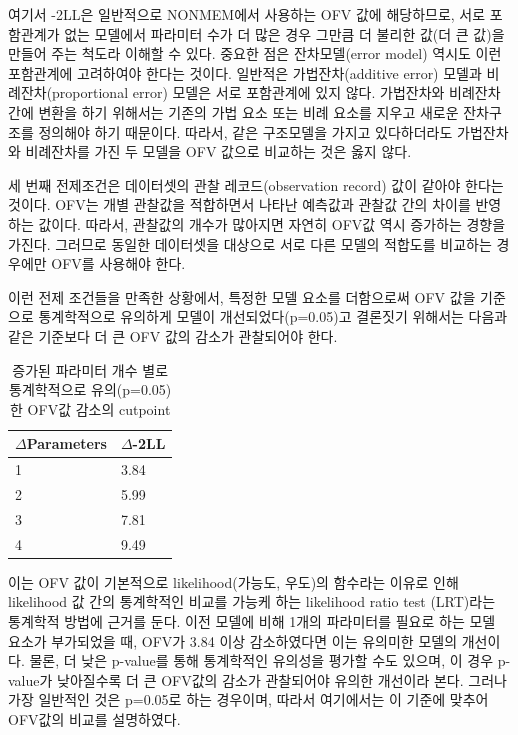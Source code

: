 \documentclass[
  10pt,
  krantz2,
  a4paper]{krantz}
\theoremstyle{definition}
\theoremstyle{definition}
\theoremstyle{definition}
\theoremstyle{remark}
\begin{document}
여기서 -2LL은 일반적으로 NONMEM에서 사용하는 OFV 값에 해당하므로, 서로 포함관계가 없는 모델에서 파라미터 수가 더 많은 경우 그만큼 더 불리한 값(더 큰 값)을 만들어 주는 척도라 이해할 수 있다. 중요한 점은 잔차모델(error model) 역시도 이런 포함관계에 고려하여야 한다는 것이다. 일반적은 가법잔차(additive error) 모델과 비례잔차(proportional error) 모델은 서로 포함관계에 있지 않다. 가법잔차와 비례잔차 간에 변환을 하기 위해서는 기존의 가법 요소 또는 비례 요소를 지우고 새로운 잔차구조를 정의해야 하기 때문이다. 따라서, 같은 구조모델을 가지고 있다하더라도 가법잔차와 비례잔차를 가진 두 모델을 OFV 값으로 비교하는 것은 옳지 않다.

세 번째 전제조건은 데이터셋의 관찰 레코드(observation record) 값이 같아야 한다는 것이다. OFV는 개별 관찰값을 적합하면서 나타난 예측값과 관찰값 간의 차이를 반영하는 값이다. 따라서, 관찰값의 개수가 많아지면 자연히 OFV값 역시 증가하는 경향을 가진다. 그러므로 동일한 데이터셋을 대상으로 서로 다른 모델의 적합도를 비교하는 경우에만 OFV를 사용해야 한다.

이런 전제 조건들을 만족한 상황에서, 특정한 모델 요소를 더함으로써 OFV 값을 기준으로 통계학적으로 유의하게 모델이 개선되었다(p=0.05)고 결론짓기 위해서는 다음과 같은 기준보다 더 큰 OFV 값의 감소가 관찰되어야 한다.

\begin{table}

\caption{\label{tab:unnamed-chunk-15}증가된 파라미터 개수 별로 통계학적으로 유의(p=0.05)한 OFV값 감소의 cutpoint}
\centering
\begin{tabular}[t]{ll}
\toprule
$\Delta$Parameters & $\Delta$-2LL\\
\midrule
1 & 3.84\\
2 & 5.99\\
3 & 7.81\\
4 & 9.49\\
\bottomrule
\end{tabular}
\end{table}

이는 OFV 값이 기본적으로 likelihood(가능도, 우도)의 함수라는 이유로 인해 likelihood 값 간의 통계학적인 비교를 가능케 하는 likelihood ratio test (LRT)라는 통계학적 방법에 근거를 둔다. 이전 모델에 비해 1개의 파라미터를 필요로 하는 모델 요소가 부가되었을 때, OFV가 3.84 이상 감소하였다면 이는 유의미한 모델의 개선이다. 물론, 더 낮은 p-value를 통해 통계학적인 유의성을 평가할 수도 있으며, 이 경우 p-value가 낮아질수록 더 큰 OFV값의 감소가 관찰되어야 유의한 개선이라 본다. 그러나 가장 일반적인 것은 p=0.05로 하는 경우이며, 따라서 여기에서는 이 기준에 맞추어 OFV값의 비교를 설명하였다.
\end{document}
